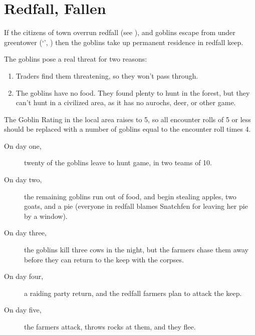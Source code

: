 \section{Redfall, Fallen}
\label{redfallFallen}

%

\begin{multicols}{2}

\noindent
If the citizens of \gls{town} overrun \gls{redfall} (see ), and goblins escape from under \gls{greentower} (`', ) then the goblins take up permanent residence in \gls{redfall} keep.

The goblins pose a real threat for two reasons:

\begin{enumerate}
  \item
  Traders find them threatening, so they won't pass through.
  \item
  The goblins have no food.
  They found plenty to hunt in the forest, but they can't hunt in a civilized area, as it has no aurochs, deer, or other game.
\end{enumerate}

The Goblin Rating in the local area raises to 5, so all encounter rolls of 5 or less should be replaced with a number of goblins equal to the encounter roll times 4.%

\begin{description}
  \item[On day one,]
  twenty of the goblins leave to hunt game, in two teams of 10.

  \item[On day two,]
  the remaining goblins run out of food, and begin stealing apples, two goats, and a pie (everyone in \gls{redfall} blames Snatchfen for leaving her pie by a window).

  \item[On day three,]
  the goblins kill three cows in the night, but the farmers chase them away before they can return to the keep with the corpses.

  \item[On day four,]
  a raiding party return, and the \gls{redfall} farmers plan to attack the keep.

  \item[On day five,]
  the farmers attack,  throws rocks at them, and they flee.


\end{description}
\end{multicols}
